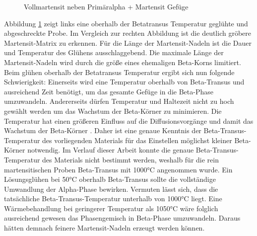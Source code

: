 \documentclass[a4paper, 11pt]{tubsreprt}
\begin{document}
\begin{figure}
\caption{Vollmartensit neben Primäralpha + Martensit Gefüge}
\label{Vollmartensit neben 960}
\end{figure}
Abbildung \ref{Vollmartensit neben 960} zeigt links eine oberhalb der Betatransus Temperatur geglühte und abgeschreckte Probe. Im Vergleich zur rechten Abbildung ist die deutlich gröbere Martensit-Matrix zu erkennen. Für die Länge der Martensit-Nadeln ist die Dauer und Temperatur des Glühens ausschlaggebend. Die maximale Länge der Martensit-Nadeln wird durch die größe eines ehemaligen Beta-Korns limitiert. Beim glühen oberhalb der Betatransus Temperatur ergibt sich nun folgende Schwierigkeit: Einerseits wird eine Temperatur oberhalb von Beta-Transus und ausreichend Zeit benötigt, um das gesamte Gefüge in die Beta-Phase umzuwandeln. Andererseits dürfen Temperatur und Haltezeit nicht zu hoch gewählt werden um das Wachstum der Beta-Körner zu minimieren. Die Temperatur hat einen größeren Einfluss auf die Diffusionsvorgänge und damit das Wachstum der Beta-Körner \cite{Donachie2001}. Daher ist eine genaue Kenntnis der Beta-Transus-Temperatur des vorliegenden Materials für das Einstellen möglichst kleiner Beta-Körner notwendig.
Im Verlauf dieser Arbeit konnte die genaue Beta-Transus-Temperatur des Materials nicht bestimmt werden, weshalb für die rein martensitischen Proben Beta-Transus mit 1000°C angenommen wurde. Ein Lösungsglühen bei 50°C oberhalb Beta-Transus sollte die vollständige Umwandlung der Alpha-Phase bewirken. Vermuten lässt sich, dass die tatsächliche Beta-Transus-Temperatur unterhalb von 1000°C liegt. Eine Wärmebehandlung bei geringerer Temperatur als 1050°C wäre folglich ausreichend gewesen das Phasengemisch in Beta-Phase umzuwandeln. Daraus hätten demnach feinere Martensit-Nadeln erzeugt werden können. 
\end{document}
